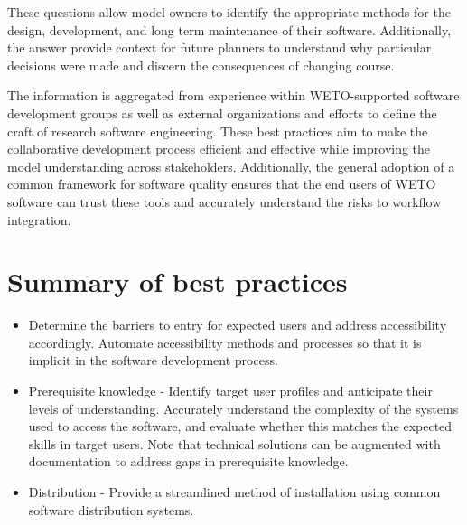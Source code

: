 \documentclass[]{nrel}
\begin{document}
These questions allow model owners to identify the appropriate methods for the design, development,
and long term maintenance of their software. Additionally, the answer provide context for future
planners to understand why particular decisions were made and discern the consequences of
changing course.

The information is aggregated from experience within WETO-supported software development
groups as well as external organizations and efforts to define the craft of research software
engineering. These best practices aim to make the collaborative development process efficient
and effective while improving the model understanding across stakeholders. Additionally,
the general adoption of a common framework for software quality ensures that the end users
of WETO software can trust these tools and accurately understand the risks to workflow integration.


\clearpage
\tableofcontents
\listoffigures

\mainmatter
\pagestyle{fancy}




\chapter{Summary of best practices}

\begin{itemize}
\item Determine the barriers to entry for expected users and address accessibility accordingly.
Automate accessibility methods and processes so that it is implicit in the software
development process.

\item Prerequisite knowledge - Identify target user profiles and anticipate their levels of understanding.
Accurately understand the complexity of the systems used to access the software, and evaluate
whether this matches the expected skills in target users.
Note that technical solutions can be augmented with documentation to address gaps in prerequisite
knowledge.

\item Distribution - Provide a streamlined method of installation using common software distribution systems.
\end{itemize}
\end{document}
